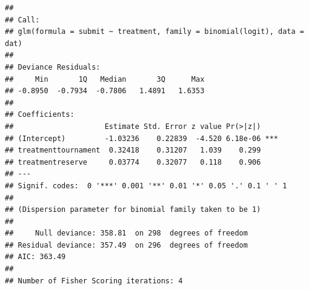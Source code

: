 \documentclass[]{article}
\newenvironment{Shaded}{\begin{snugshade}}{\end{snugshade}}
\newcommand{\KeywordTok}[1]{\textcolor[rgb]{0.13,0.29,0.53}{\textbf{#1}}}
\newcommand{\DataTypeTok}[1]{\textcolor[rgb]{0.13,0.29,0.53}{#1}}
\newcommand{\DecValTok}[1]{\textcolor[rgb]{0.00,0.00,0.81}{#1}}
\newcommand{\StringTok}[1]{\textcolor[rgb]{0.31,0.60,0.02}{#1}}
\newcommand{\CommentTok}[1]{\textcolor[rgb]{0.56,0.35,0.01}{\textit{#1}}}
\newcommand{\OtherTok}[1]{\textcolor[rgb]{0.56,0.35,0.01}{#1}}
\newcommand{\OperatorTok}[1]{\textcolor[rgb]{0.81,0.36,0.00}{\textbf{#1}}}
\newcommand{\NormalTok}[1]{#1}
\let\oldShaded\Shaded
\let\endoldShaded\endShaded
\renewenvironment{Shaded}{\footnotesize\oldShaded}{\endoldShaded}
\begin{document}
\begin{Shaded}
\end{Shaded}

\begin{verbatim}
## 
## Call:
## glm(formula = submit ~ treatment, family = binomial(logit), data = dat)
## 
## Deviance Residuals: 
##     Min       1Q   Median       3Q      Max  
## -0.8950  -0.7934  -0.7806   1.4891   1.6353  
## 
## Coefficients:
##                     Estimate Std. Error z value Pr(>|z|)    
## (Intercept)         -1.03236    0.22839  -4.520 6.18e-06 ***
## treatmenttournament  0.32418    0.31207   1.039    0.299    
## treatmentreserve     0.03774    0.32077   0.118    0.906    
## ---
## Signif. codes:  0 '***' 0.001 '**' 0.01 '*' 0.05 '.' 0.1 ' ' 1
## 
## (Dispersion parameter for binomial family taken to be 1)
## 
##     Null deviance: 358.81  on 298  degrees of freedom
## Residual deviance: 357.49  on 296  degrees of freedom
## AIC: 363.49
## 
## Number of Fisher Scoring iterations: 4
\end{verbatim}
\end{document}
